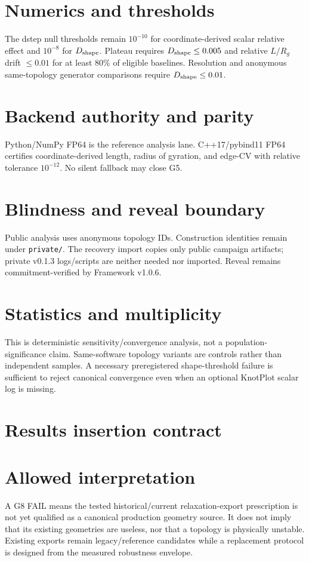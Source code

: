\documentclass[11pt,a4paper]{article}
\newcommand{\code}[1]{\texttt{#1}}
\begin{document}
\section{Numerics and thresholds}
The dstep null thresholds remain $10^{-10}$ for coordinate-derived scalar relative effect and $10^{-8}$ for $D_{\rm shape}$. Plateau requires $D_{\rm shape}\le0.005$ and relative $L/R_g$ drift $\le0.01$ for at least 80\% of eligible baselines. Resolution and anonymous same-topology generator comparisons require $D_{\rm shape}\le0.01$.
\section{Backend authority and parity}
Python/NumPy FP64 is the reference analysis lane. C++17/pybind11 FP64 certifies coordinate-derived length, radius of gyration, and edge-CV with relative tolerance $10^{-12}$. No silent fallback may close G5.
\section{Blindness and reveal boundary}
Public analysis uses anonymous topology IDs. Construction identities remain under \code{private/}. The recovery import copies only public campaign artifacts; private v0.1.3 logs/scripts are neither needed nor imported. Reveal remains commitment-verified by Framework v1.0.6.
\section{Statistics and multiplicity}
This is deterministic sensitivity/convergence analysis, not a population-significance claim. Same-software topology variants are controls rather than independent samples. A necessary preregistered shape-threshold failure is sufficient to reject canonical convergence even when an optional KnotPlot scalar log is missing.
\section{Results insertion contract}
\section{Allowed interpretation}
A G8 FAIL means the tested historical/current relaxation-export prescription is not yet qualified as a canonical production geometry source. It does not imply that its existing geometries are useless, nor that a topology is physically unstable. Existing exports remain legacy/reference candidates while a replacement protocol is designed from the measured robustness envelope.
\end{document}
